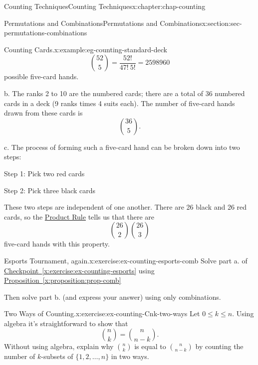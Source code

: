 \documentclass[oneside,10pt,]{book}
\newcommand{\xreffont}{\relax}
\numberwithin{equation}{section}
\begin{document}
\begin{chapterptx}{Counting Techniques}{}{Counting Techniques}{}{}{x:chapter:chap-counting}
\begin{sectionptx}{Permutations and Combinations}{}{Permutations and Combinations}{}{}{x:section:sec-permutations-combinations}
\begin{example}{Counting Cards.}{x:example:eg-counting-standard-deck}
\begin{equation*}
\binom{52}{5} = \frac{52!}{47! \ 5!} = 2598960
\end{equation*}
possible five-card hands.%
\par
b. The ranks 2 to 10 are the numbered cards; there are a total of 36 numbered cards in a deck (9 ranks times 4 suits each). The number of five-card hands drawn from these cards is%
\begin{equation*}
\binom{36}{5}\text{.}
\end{equation*}
%
\par
c. The process of forming such a five-card hand can be broken down into two steps:%
\begin{sidebyside}{2}{0.05}{0.05}{0.1}%
\begin{sbspanel}{0.4}%
Step 1: Pick two red cards%
\end{sbspanel}%
\begin{sbspanel}{0.4}%
\par
Step 2: Pick three black cards%
\end{sbspanel}%
\end{sidebyside}%
\par
These two steps are independent of one another. There are 26 black and 26 red cards, so the \hyperref[x:principle:prin-prod-rule]{Product Rule} tells us that there are%
\begin{equation*}
\binom{26}{2}\binom{26}{3}
\end{equation*}
five-card hands with this property.%
\end{example}
\begin{inlineexercise}{Esports Tournament, again.}{x:exercise:ex-counting-esports-comb}%
Solve part a. of \hyperref[x:exercise:ex-counting-esports]{Checkpoint~{\xreffont\ref{x:exercise:ex-counting-esports}}} using \hyperref[x:proposition:prop-comb]{Proposition~{\xreffont\ref{x:proposition:prop-comb}}}%
\par
Then solve part b. (and express your answer) using only combinations.%
\end{inlineexercise}
\begin{inlineexercise}{Two Ways of Counting.}{x:exercise:ex-counting-Cnk-two-ways}%
Let \(0 \leq k \leq n\). Using algebra it's straightforward to show that%
\begin{equation*}
\binom{n}{k} = \binom{n}{n-k}\text{.}
\end{equation*}
Without using algebra, explain why \(\displaystyle\binom{n}{k}\) is equal to \(\displaystyle\binom{n}{n-k}\) by counting the number of \(k\)-subsets of \(\{1,2,\ldots,n\}\) in two ways.%

\end{inlineexercise}
\end{sectionptx}
\end{chapterptx}
\end{document}
